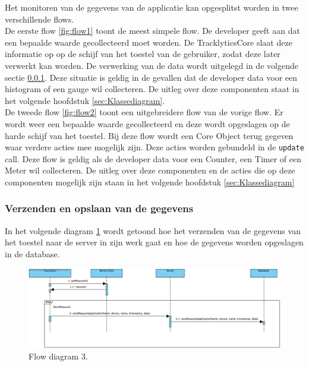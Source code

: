 Het monitoren van de gegevens van de applicatie kan opgesplitst worden in twee verschillende flows. \\

De eerste flow \ref{fig:flow1} toont de meest simpele flow. De developer geeft aan dat een bepaalde waarde gecollecteerd moet worden. De TracklyticsCore slaat deze informatie op op de schijf van het toestel van de gebruiker, zodat deze later verwerkt kan worden. De verwerking van de data wordt uitgelegd in de volgende sectie \ref{sec:VerzendenEnOpslaanVanGegevens}. Deze situatie is geldig in de gevallen dat de developer data voor een histogram of een gauge wil collecteren. De uitleg over deze componenten staat in het volgende hoofdstuk \ref{sec:Klassediagram}.\\

De tweede flow \ref{fig:flow2} toont een uitgebreidere flow van de vorige flow. Er wordt weer een bepaalde waarde gecollecteerd en deze wordt opgeslagen op de harde schijf van het toestel. Bij deze flow wordt een Core Object terug gegeven waar verdere acties mee mogelijk zijn. Deze acties worden gebundeld in de \texttt{update} call. Deze flow is geldig als de developer data voor een Counter, een Timer of een Meter wil collecteren. De uitleg over deze componenten en de acties die op deze componenten mogelijk zijn staan in het volgende hoofdstuk \ref{sec:Klassediagram} \\


\subsubsection{Verzenden en opslaan van de gegevens} \label{sec:VerzendenEnOpslaanVanGegevens}
In het volgende diagram \ref{fig:flow3} wordt getoond hoe het verzenden van de gegevens van het toestel naar de server in zijn werk gaat en hoe de gegevens worden opgeslagen in de database. 
\begin{figure}[!h]
  \centering
  \includegraphics[scale=0.4]{Afbeeldingen/Architectuur/FlowDiagram3}
  \caption{Flow diagram 3.}
  \label{fig:flow3}
\end{figure}


